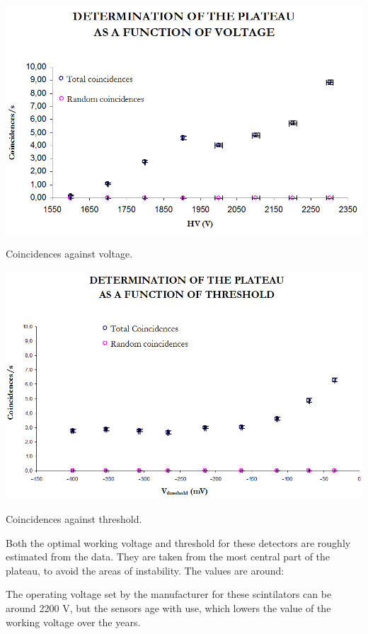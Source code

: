 			\bfi[H]
				\bc\includegraphics[width=\textwidth]{img/plateau1.png}\ec
				\caption[Coincidences against voltage.]{Coincidences against voltage.}\label{fig:voltage}
			\efi

			\bfi[H]
				\bc\includegraphics[width=\textwidth]{img/plateau2.png}\ec
				\caption[Coincidences against threshold.]{Coincidences against threshold.}\label{fig:threshold}
			\efi

Both the optimal working voltage and threshold for these detectors are roughly estimated from the data. They are taken from the most central part of the plateau, to avoid the areas of instability. The values are around:



The operating voltage set by the manufacturer for these scintilators can be around 2200 V, but the sensors age with use, which lowers the value of the working voltage over the years.



